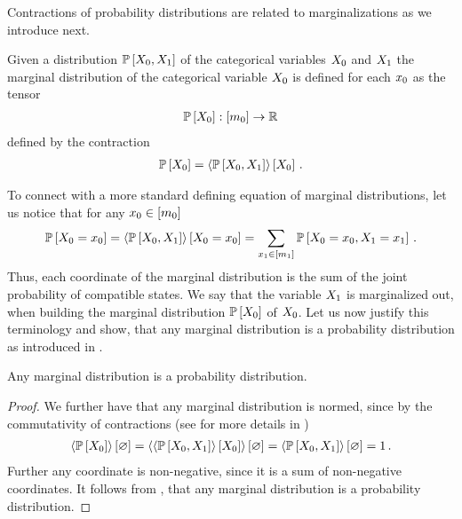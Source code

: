 


Contractions of probability distributions are related to marginalizations as we introduce next.

\begin{definition}
    \label{def:marginalProbability}
    Given a distribution $\mathbb{P}\left[X_{0},X_{1}\right]$ of the categorical variables $X_{0}$ and $X_{1}$ the marginal distribution of the categorical variable $X_{0}$ is defined for each $x_{0}$ as the tensor
    \begin{align*}
        \mathbb{P}\left[X_{0}\right] : [m_{0}] \rightarrow \mathbb{R}
    \end{align*}
    defined by the contraction
    \begin{align*}
        \mathbb{P}\left[X_{0}\right]
        = \left\langle \mathbb{P}\left[X_{0},X_{1}\right]\right\rangle \left[ X_{0} \right] \, .
    \end{align*}
\end{definition}

To connect with a more standard defining equation of marginal distributions, let us notice that for any $x_{0}\in[m_{0}]$
\begin{align*}
    \mathbb{P}\left[X_{0}=x_{0}\right]
    = \left\langle \mathbb{P}\left[X_{0},X_{1}\right]\right\rangle \left[ X_{0}=x_{0} \right]
    = \sum_{x_{1}\in[m_{1}]} \mathbb{P}\left[X_{0}=x_{0},X_{1}=x_{1}\right] \, .
\end{align*}
Thus, each coordinate of the marginal distribution is the sum of the joint probability of compatible states.
We say that the variable $X_{1}$ is marginalized out, when building the marginal distribution $\mathbb{P}\left[X_{0}\right]$ of $X_{0}$.
Let us now justify this terminology and show, that any marginal distribution is a probability distribution as introduced in .

\begin{theorem}
    \label{the:marginalContraction}
    Any marginal distribution is a probability distribution.
\end{theorem}
\begin{proof}
    We further have that any marginal distribution is normed, since by the commutativity of contractions (see for more details  in )
    \begin{align*}
        \left\langle \mathbb{P}\left[X_{0}\right]\right\rangle \left[ \varnothing \right] = \left\langle \left\langle \mathbb{P}\left[X_{0},X_{1}\right]\right\rangle \left[ X_{0} \right]\right\rangle \left[ \varnothing \right] = \left\langle \mathbb{P}\left[X_{0},X_{1}\right]\right\rangle \left[ \varnothing \right] = 1 \, .
    \end{align*}
    Further any coordinate is non-negative, since it is a sum of non-negative coordinates.
    It follows from , that any marginal distribution is a probability distribution.
\end{proof}

